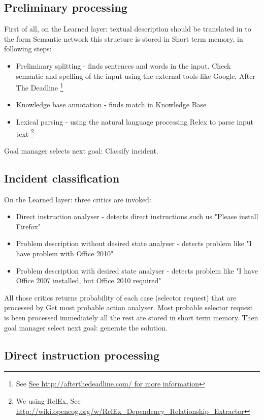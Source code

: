 \documentclass[conference]{IEEEtran}
\begin{document}
\subsection{Preliminary processing}

First of all, on the Learned layer: textual description should be translated in to the form Semantic network this structure is stored in Short term memory, in following steps:

\begin{itemize}
  \item Preliminary splitting - finds sentences and words in the input. Check semantic and spelling of the input using the external tools like Google, After The Deadline \footnote{See \url{See http://afterthedeadline.com/ for more information}}
  \item Knowledge base annotation - finds match in Knowledge Base
  \item Lexical parsing - using the natural language processing Relex to parse input text \footnote{We using RelEx, See \url{http://wiki.opencog.org/w/RelEx_Dependency_Relationship_Extractor}}
\end{itemize}

Goal manager selects next goal: Classify incident.

\subsection{Incident classification}

On the Learned layer: three critics are invoked:
\begin{itemize}
  \item Direct instruction analyser - detects direct instructions such us "Please install Firefox"
  \item Problem description without desired state analyser - detects problem like "I have problem with Office 2010"
  \item Problem description with desired state analyser - detects problem like "I have Office 2007 installed, but Office 2010 required"
\end{itemize}

All those critics returns probability of each case (selector request) that are processed by Get most probable action analyser. Most probable selector request is been processed immediately all the rest are stored in short term memory. Then goal manager select next goal: generate the solution.

\subsection{Direct instruction processing}
\end{document}
